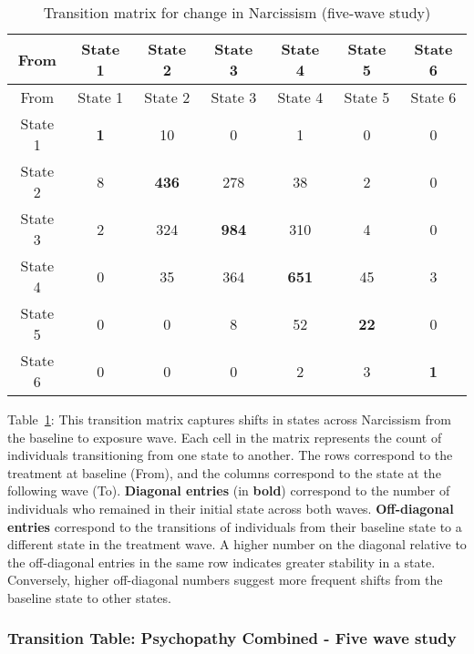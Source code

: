 \documentclass[
  single column]{article}
\begin{document}
\begin{longtable}[]{@{}ccccccc@{}}
\caption{Transition matrix for change in Narcissism (five-wave
study)}\label{tbl-table-transition-narcissism-long}\tabularnewline
\toprule\noalign{}
From & State 1 & State 2 & State 3 & State 4 & State 5 & State 6 \\
\midrule\noalign{}
\endfirsthead
\toprule\noalign{}
From & State 1 & State 2 & State 3 & State 4 & State 5 & State 6 \\
\midrule\noalign{}
\endhead
\bottomrule\noalign{}
\endlastfoot
State 1 & \textbf{1} & 10 & 0 & 1 & 0 & 0 \\
State 2 & 8 & \textbf{436} & 278 & 38 & 2 & 0 \\
State 3 & 2 & 324 & \textbf{984} & 310 & 4 & 0 \\
State 4 & 0 & 35 & 364 & \textbf{651} & 45 & 3 \\
State 5 & 0 & 0 & 8 & 52 & \textbf{22} & 0 \\
State 6 & 0 & 0 & 0 & 2 & 3 & \textbf{1} \\
\end{longtable}

Table~\ref{tbl-table-transition-narcissism-long}: This transition matrix
captures shifts in states across Narcissism from the baseline to
exposure wave. Each cell in the matrix represents the count of
individuals transitioning from one state to another. The rows correspond
to the treatment at baseline (From), and the columns correspond to the
state at the following wave (To). \textbf{Diagonal entries} (in
\textbf{bold}) correspond to the number of individuals who remained in
their initial state across both waves. \textbf{Off-diagonal entries}
correspond to the transitions of individuals from their baseline state
to a different state in the treatment wave. A higher number on the
diagonal relative to the off-diagonal entries in the same row indicates
greater stability in a state. Conversely, higher off-diagonal numbers
suggest more frequent shifts from the baseline state to other states.

\subsubsection{Transition Table: Psychopathy Combined - Five wave
study}\label{transition-table-psychopathy-combined---five-wave-study}
\end{document}
